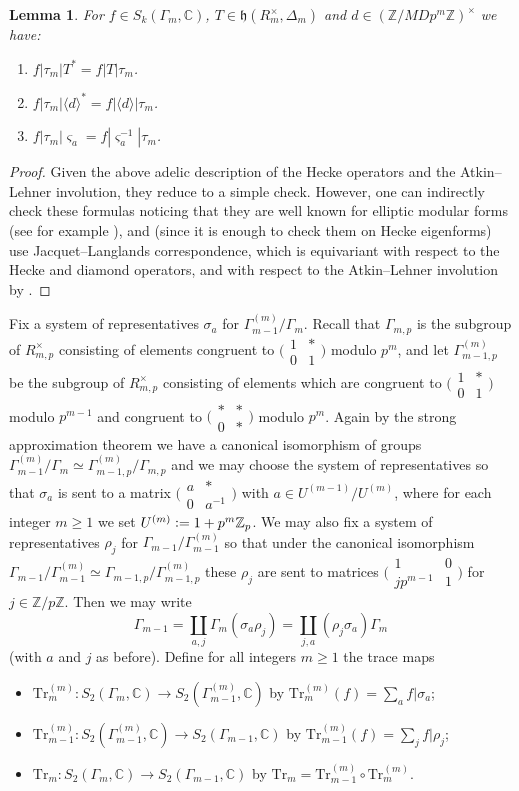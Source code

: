 \documentclass[a4paper,11pt]{amsart}
\numberwithin{equation}{section}
\theoremstyle{plain}
\newtheorem{lemma}[theorem]{Lemma}
\theoremstyle{definition}
\theoremstyle{remark}
\newcommand{\Z}{\mathbb{Z}}
\newcommand{\C}{\mathbb{C}}
\newcommand{\defeq}{\vcentcolon=}
\newcommand{\smallmat}[4]{\bigl(\begin{smallmatrix}#1&#2\\#3&#4\end{smallmatrix}\bigr)}
\begin{document}
\begin{lemma}\label{Ohtaformulas}
For $f\in S_k(\Gamma_m,\C)$, $T\in\mathfrak{h}(R_m^\times,\Delta_m)$ 
and $d\in (\Z/MDp^m\Z)^\times$ we have: 
\begin{enumerate}
\item $f|\tau_m|T^*=f|T|\tau_m$. 
\item $f|\tau_m|\langle d\rangle^*=f|\langle d\rangle|\tau_m$. 
\item $f|\tau_m|\varsigma_a=f|\varsigma_a^{-1}|\tau_m$.    \end{enumerate}
\end{lemma}
\begin{proof}
Given the above adelic description of the Hecke operators and the Atkin--Lehner involution, they reduce to a simple check. However, one can indirectly check these formulas noticing that they are well known for elliptic modular forms (see for example \cite[(2.1.8)]{Ohta-ES}), and (since it is enough to check them on Hecke eigenforms) use Jacquet--Langlands correspondence, which is equivariant with respect to the Hecke and diamond operators, and with respect to the Atkin--Lehner involution by \cite[Theorem 1.2]{BD96}.\end{proof}

Fix a system of representatives $\sigma_a$ for $\Gamma_{m-1}^{(m)}/\Gamma_m$. Recall that $\Gamma_{m,p}$ is the subgroup of $R_{m,p}^\times$ consisting of elements congruent to $\smallmat 1*01$ modulo $p^m$, and let $\Gamma_{m-1,p}^{(m)}$ be the subgroup of $R_{m,p}^\times$ consisting of elements which are congruent to $\smallmat 1*01$ modulo $p^{m-1}$ and congruent to $\smallmat **0*$ modulo $p^m$. Again by the strong approximation theorem we have a canonical isomorphism of groups $\Gamma_{m-1}^{(m)}/\Gamma_m\simeq \Gamma_{m-1,p}^{(m)}/\Gamma_{m,p}$ and we may choose the system of representatives so that $\sigma_a$ is sent to a matrix $\smallmat a{*}0{a^{-1}}$ with $a\in U^{(m-1)}/U^{(m)}$, where for each integer $m\geq 1$ we set $U^{(m)}\defeq 1+p^{m}\Z_p$. We may also fix a system of representatives $\rho_j$ for $\Gamma_{m-1}/\Gamma_{m-1}^{(m)}$ so that under the canonical isomorphism $\Gamma_{m-1}/\Gamma_{m-1}^{(m)}\simeq\Gamma_{m-1,p}/\Gamma_{m-1,p}^{(m)}$ these $\rho_j$ are sent to matrices $\smallmat 1{0}{jp^{m-1}}{1}$ for $j\in\Z/p\Z$. Then we may write \[\Gamma_{m-1}=\coprod_{a,j}\Gamma_m(\sigma_a\rho_j)=\coprod_{j,a}(\rho_j\sigma_a)\Gamma_m\] (with $a$ and $j$ as before). Define for all integers $m\geq 1$ the trace maps
\begin{itemize}
\item $\mathrm{Tr}_m^{(m)}\colon S_2(\Gamma_m,\C)\rightarrow S_2(\Gamma_{m-1}^{(m)},\C)$ by $\mathrm{Tr}_m^{(m)}(f)=\sum_a f|\sigma_a$;
\item $\mathrm{Tr}_{m-1}^{(m)}\colon S_2(\Gamma^{(m)}_{m-1},\C)\rightarrow S_2(\Gamma_{m-1},\C)$
by $\mathrm{Tr}_{m-1}^{(m)}(f)=\sum_j f|\rho_j$;
\item $\mathrm{Tr}_m\colon S_2(\Gamma_m,\C)\to S_2(\Gamma_{m-1},\C)$ by $\mathrm{Tr}_m=\mathrm{Tr}^{(m)}_{m-1}\circ\mathrm{Tr}^{(m)}_m$.
\end{itemize}
\end{document}
